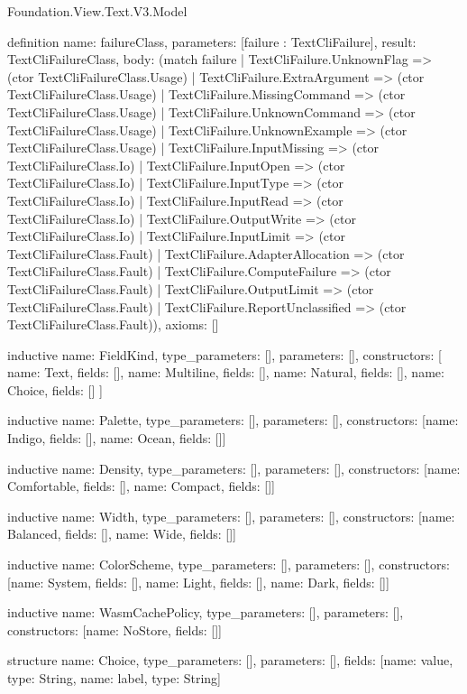 \begin{lexlean}{Foundation.View.Text.V3.Model}
\begin{semanticmodule}
definition{
  name: failureClass,
  parameters: [failure : TextCliFailure],
  result: TextCliFailureClass,
  body: (match failure
    | TextCliFailure.UnknownFlag => (ctor TextCliFailureClass.Usage)
    | TextCliFailure.ExtraArgument => (ctor TextCliFailureClass.Usage)
    | TextCliFailure.MissingCommand => (ctor TextCliFailureClass.Usage)
    | TextCliFailure.UnknownCommand => (ctor TextCliFailureClass.Usage)
    | TextCliFailure.UnknownExample => (ctor TextCliFailureClass.Usage)
    | TextCliFailure.InputMissing => (ctor TextCliFailureClass.Io)
    | TextCliFailure.InputOpen => (ctor TextCliFailureClass.Io)
    | TextCliFailure.InputType => (ctor TextCliFailureClass.Io)
    | TextCliFailure.InputRead => (ctor TextCliFailureClass.Io)
    | TextCliFailure.OutputWrite => (ctor TextCliFailureClass.Io)
    | TextCliFailure.InputLimit => (ctor TextCliFailureClass.Fault)
    | TextCliFailure.AdapterAllocation => (ctor TextCliFailureClass.Fault)
    | TextCliFailure.ComputeFailure => (ctor TextCliFailureClass.Fault)
    | TextCliFailure.OutputLimit => (ctor TextCliFailureClass.Fault)
    | TextCliFailure.ReportUnclassified => (ctor TextCliFailureClass.Fault)),
  axioms: []
}

inductive{
  name: FieldKind,
  type_parameters: [],
  parameters: [],
  constructors: [
    {name: Text, fields: []},
    {name: Multiline, fields: []},
    {name: Natural, fields: []},
    {name: Choice, fields: []}
  ]
}

inductive{
  name: Palette,
  type_parameters: [],
  parameters: [],
  constructors: [{name: Indigo, fields: []}, {name: Ocean, fields: []}]
}

inductive{
  name: Density,
  type_parameters: [],
  parameters: [],
  constructors: [{name: Comfortable, fields: []}, {name: Compact, fields: []}]
}

inductive{
  name: Width,
  type_parameters: [],
  parameters: [],
  constructors: [{name: Balanced, fields: []}, {name: Wide, fields: []}]
}

inductive{
  name: ColorScheme,
  type_parameters: [],
  parameters: [],
  constructors: [{name: System, fields: []}, {name: Light, fields: []}, {name: Dark, fields: []}]
}

inductive{
  name: WasmCachePolicy,
  type_parameters: [],
  parameters: [],
  constructors: [{name: NoStore, fields: []}]
}

structure{
  name: Choice,
  type_parameters: [],
  parameters: [],
  fields: [{name: value, type: String}, {name: label, type: String}]
}


\end{semanticmodule}
\end{lexlean}
